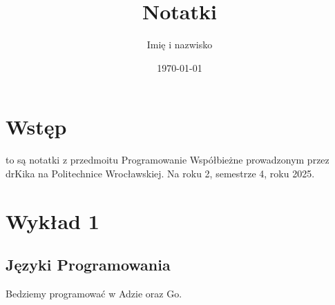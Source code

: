 \documentclass[11pt,a4paper]{article}
\title{Notatki}
\author{Imię i nazwisko}
\date{\today}
\begin{document}
\maketitle

\tableofcontents  %
\newpage
\section{Wstęp}
to są notatki z przedmoitu Programowanie Współbieżne prowadzonym przez drKika na Politechnice Wrocławskiej. Na roku 2, semestrze 4, roku 2025.

\section{Wykład 1}
\subsection{Języki Programowania}
Bedziemy programować w Adzie oraz Go.
\end{document}
